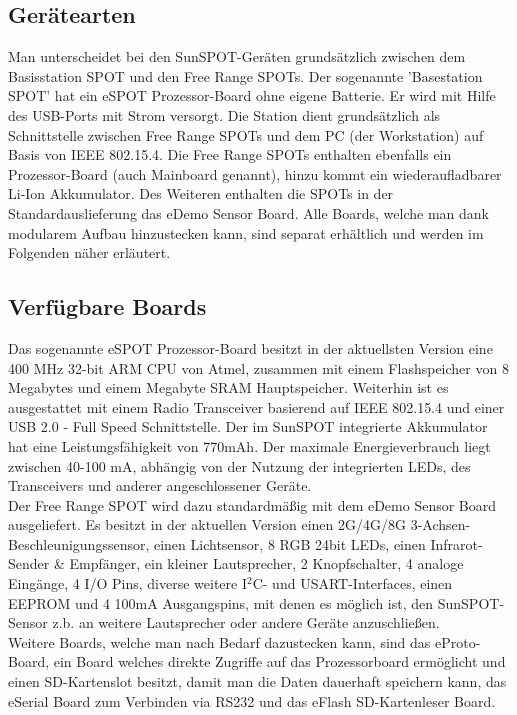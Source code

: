 
\subsection{Gerätearten}\label{ss:Geraetearten}
Man unterscheidet bei den SunSPOT-Geräten grundsätzlich zwischen dem Basisstation SPOT und den Free Range SPOTs.
Der sogenannte 'Basestation SPOT' hat ein eSPOT Prozessor-Board ohne eigene Batterie. Er wird mit Hilfe des USB-Ports mit Strom versorgt. Die Station dient grundsätzlich als Schnittstelle zwischen Free Range SPOTs und dem PC (der Workstation) auf Basis von IEEE 802.15.4.
Die Free Range SPOTs enthalten ebenfalls ein Prozessor-Board (auch Mainboard genannt), hinzu kommt ein wiederaufladbarer Li-Ion Akkumulator. Des Weiteren enthalten die SPOTs in der Standardauslieferung das eDemo Sensor Board. Alle Boards, welche man dank modularem Aufbau hinzustecken kann, sind separat erhältlich und werden im Folgenden näher erläutert.\\


\subsection{Verfügbare Boards}\label{ss:VerfuegbareBoards}
Das sogenannte eSPOT Prozessor-Board besitzt in der aktuellsten Version eine 400 MHz 32-bit ARM CPU von Atmel, zusammen mit einem Flashspeicher von 8 Megabytes und einem Megabyte SRAM Hauptspeicher. Weiterhin ist es ausgestattet mit einem Radio Transceiver basierend auf IEEE 802.15.4 und einer USB 2.0 - Full Speed Schnittstelle. Der im SunSPOT integrierte Akkumulator hat eine Leistungsfähigkeit von 770mAh. Der maximale Energieverbrauch liegt zwischen 40-100 mA, abhängig von der Nutzung der integrierten LEDs, des Transceivers und anderer angeschlossener Geräte. \cite{d:horan} \cite{d:spotmain} \\

Der Free Range SPOT wird dazu standardmäßig mit dem eDemo Sensor Board ausgeliefert. Es besitzt in der aktuellen Version einen 2G/4G/8G 3-Achsen-Beschleunigungssensor, einen Lichtsensor, 8 RGB 24bit LEDs, einen Infrarot-Sender \& Empfänger, ein kleiner Lautsprecher, 2 Knopfschalter, 4 analoge Eingänge, 4 I/O Pins, diverse weitere I$^2$C- und USART-Interfaces, einen EEPROM und 4 100mA Ausgangspins, mit denen es möglich ist, den SunSPOT-Sensor z.b. an weitere Lautsprecher oder andere Geräte anzuschließen. \cite{d:horan} \cite{d:spotdemo} \\

Weitere Boards, welche man nach Bedarf dazustecken kann, sind das eProto-Board, ein Board welches direkte Zugriffe auf das Prozessorboard ermöglicht und einen SD-Kartenslot besitzt, damit man die Daten dauerhaft speichern kann, das eSerial Board zum Verbinden via RS232 und das eFlash SD-Kartenleser Board. \cite{d:horan} \\